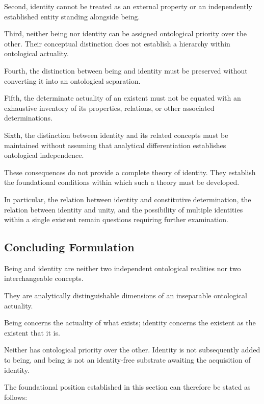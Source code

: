 Second, identity cannot be treated
as an external property or an
independently established entity
standing alongside being.

Third, neither being nor identity
can be assigned ontological priority
over the other. Their conceptual
distinction does not establish
a hierarchy within ontological actuality.

Fourth, the distinction between
being and identity must be preserved
without converting it into an
ontological separation.

Fifth, the determinate actuality
of an existent must not be equated
with an exhaustive inventory of
its properties, relations, or
other associated determinations.

Sixth, the distinction between
identity and its related concepts
must be maintained without assuming
that analytical differentiation
establishes ontological independence.

These consequences do not provide
a complete theory of identity.
They establish the foundational
conditions within which such a
theory must be developed.

In particular, the relation between
identity and constitutive determination,
the relation between identity and unity,
and the possibility of multiple identities
within a single existent remain questions
requiring further examination.



\subsection{Concluding Formulation}

Being and identity are neither two
independent ontological realities
nor two interchangeable concepts.

They are analytically distinguishable
dimensions of an inseparable ontological
actuality.

Being concerns the actuality of what
exists; identity concerns the existent
as the existent that it is.

Neither has ontological priority over
the other. Identity is not subsequently
added to being, and being is not an
identity-free substrate awaiting
the acquisition of identity.

The foundational position established
in this section can therefore be stated
as follows:

